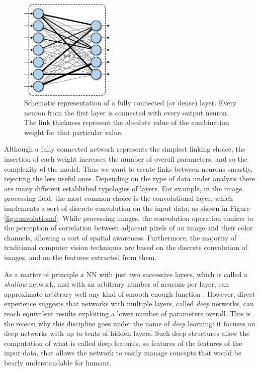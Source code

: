 \documentclass[12pt,a4paper]{report}
\begin{document}
\begin{figure}
    \centering
    \includegraphics[width = 0.4\textwidth]{images/fully_connected}
    \caption{Schematic representation of a fully connected (or dense) layer. Every neuron from the first layer is connected with every output neuron. The link thickness represent the absolute value of the combination weight for that particular value. }
    \label{fig:fully_connected}
\end{figure}

Although a fully connected network represents the simplest linking choice, the insertion of each weight increases the number of overall parameters, and so the complexity of the model. Thus we want to create links between neurons smartly, rejecting the less useful ones. Depending on the type of data under analysis there are many different established typologies of layers. For example, in the image processing field, the most common choice is the convolutional layer, which implements a sort of discrete convolution on the input data, as shown in Figure \ref{fig:convolutional}. While processing images, the convolution operation confers to the perception of correlation between adjacent pixels of an image and their color channels, allowing a sort of spatial awareness. Furthermore, the majority of traditional computer vision techniques are based on the discrete convolution of images, and on the features extracted from them.

As a matter of principle a NN with just two successive layers, which is called a \textit{shallow} network, and with an arbitrary number of neurons per layer, can approximate arbitrary well any kind of smooth enough function \cite{pinkus_1999}. However, direct experience suggests that networks with multiple layers, called \textit{deep} networks, can reach equivalent results exploiting a lower number of parameters overall. This is the reason why this discipline goes under the name of \textit{deep} learning: it focuses on deep networks with up to tents of hidden layers. Such deep structures allow the computation of what is called deep features, so features of the features of the input data, that allows the network to easily manage concepts that would be bearly understandable for humans.
\end{document}

